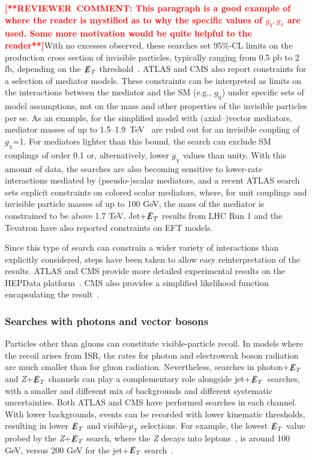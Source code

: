 \documentclass{ar-1col}
\newcommand{\chiDM}{\ensuremath{\chi}\xspace}
\newcommand{\IP}{invisible particle}
\newcommand{\gDM}{\ensuremath{g_{\chiDM}}\xspace}
\newcommand{\gdm}{\gDM}
\newcommand{\gq}{$g_{\mathrm{q}}$\xspace}
\newcommand{\pt}{\ensuremath{p_\mathrm{T}}\xspace}
\newcommand{\MET}{\ensuremath{\slashed{E}_T}\xspace}
\newcommand{\fb}{\ensuremath{\mathrm{fb}}\xspace}
\newcommand{\pb}{\ensuremath{\mathrm{pb}}\xspace}
\begin{document}
\textbf{\textcolor{red}{[**REVIEWER\ COMMENT: This paragraph is a good example of where the reader is mystified as to why the specific values of $g_q, g_x$ are used.  Some more motivation would be quite helpful to the reader**]}}With no excesses observed, these searches set 95\%-CL limits
on the production cross section of {\IP}s, typically ranging from
0.5 \pb to 2 \fb, depending on the \MET
threshold~\cite{Aaboud:2017phn}. ATLAS and CMS also report
constraints for a selection of mediator models. These constraints
can be interpreted as limits on the interactions between the
mediator and the SM (e.g., \gq) under specific sets of model
assumptions, not on the mass and other properties of the {\IP}s
per se. As an example, for the simplified model with
(axial--)vector mediators, mediator masses of up to
1.5--1.9~TeV~\cite{Aaboud:2017phn,Sirunyan:2017jix} are ruled out
for an invisible coupling of \gdm=1. For mediators lighter than
this bound, the search can exclude SM couplings of order 0.1 or,
alternatively, lower \gdm values than unity. With this amount of
data, the searches are also becoming sensitive to lower-rate
interactions mediated by (pseudo-)scalar mediators, and a recent
ATLAS search~\cite{Aaboud:2017phn} sets explicit constraints on
colored scalar mediators, where, for unit couplings and invisible
particle masses of up to 100 GeV, the mass of the mediator is
constrained to be above 1.7 TeV. Jet+\MET results from LHC Run 1
and the Tevatron have also reported constraints on EFT models.

Since this type of search can constrain a wider variety of
interactions than explicitly considered, steps have been taken to
allow easy reinterpretation of the results. ATLAS and CMS provide
more detailed experimental results on the HEPData
platform~\cite{Maguire:2017ypu}. CMS also provides a simplified
likelihood function encapsulating the
result~\cite{Collaboration:2242860,Sirunyan:2017jix}.

\subsubsection{Searches with photons and vector bosons}\label{subsub:monoV}

Particles other than gluons can constitute visible-particle
recoil. In models where the recoil arises from ISR, the rates
for photon and electroweak boson radiation are much smaller than
for gluon radiation. Nevertheless, searches in photon+\MET and
\textit{Z}+\MET channels can play a complementary role alongside jet+\MET\ searches,
with a smaller and different mix of backgrounds and different
systematic uncertainties. Both ATLAS and CMS have performed
searches in each channel. With lower backgrounds, events can be
recorded with lower kinematic thresholds, resulting in lower \MET
and visible-\pt{} selections. For example, the lowest \MET value
probed by the \textit{Z}+\MET search, where the \textit{Z} decays into
leptons~\cite{Sirunyan:2017qfc,Aaboud:2017bja}, is around 100 GeV,
versus 200 GeV for the jet+\MET search~\cite{Sirunyan:2017jix}.
\end{document}
